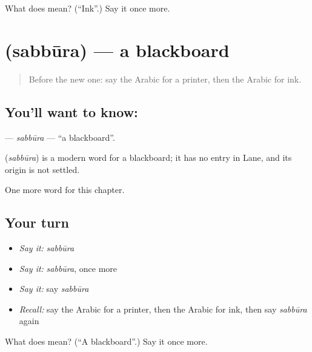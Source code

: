 \begin{tcolorbox}[breakable,colback=teal!4,colframe=teal!35!black,title={Before you move on}]
What does  mean? (\textquotedblleft{}Ink\textquotedblright{}.) Say it once more.
\end{tcolorbox}
\section[\texorpdfstring{\ar{سبورة} (sabbūra)}{سبورة (sabbūra)}]{ (sabbūra) — a blackboard}

\label{lesson:AR-C274-sabbura}



\begin{quote}
Before the new one: say the Arabic for a printer, then the Arabic for ink.
\end{quote}

\subsection*{You'll want to know: }
\textbf{} — \emph{sabbūra} — \textquotedblleft{}a blackboard\textquotedblright{}.

\begin{cousinweb}
\textbf{} (\emph{sabbūra}) is a modern word for a blackboard; it has no entry in Lane, and its origin is not settled.
\end{cousinweb}

\begin{grammarlens}[title={What you've built}]
One more word for this chapter.
\end{grammarlens}

\subsection*{Your turn}
\begin{itemize}
\raggedright
  \item \emph{Say it:} \emph{sabbūra}
  \item \emph{Say it:} \emph{sabbūra}, once more
  \item \emph{Say it:} say \emph{sabbūra}
  \item \emph{Recall:} say the Arabic for a printer, then the Arabic for ink, then say \emph{sabbūra} again
\end{itemize}

\begin{tcolorbox}[breakable,colback=teal!4,colframe=teal!35!black,title={Before you move on}]
What does  mean? (\textquotedblleft{}A blackboard\textquotedblright{}.) Say it once more.
\end{tcolorbox}
